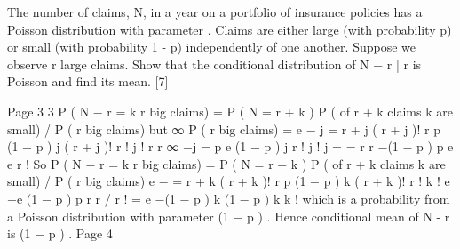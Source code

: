 \documentclass[a4paper,12pt]{article}
\begin{document}
The number of claims, N, in a year on a portfolio of insurance policies has a Poisson
distribution with parameter \lambda. Claims are either large (with probability p) or small
(with probability 1 - p) independently of one another.
Suppose we observe r large claims. Show that the conditional distribution of N − r | r
is Poisson and find its mean.
[7]

Page 3%
3
P ( N − r = k r big claims) = P ( N = r + k ) \times  P ( of r + k claims k are small) / P ( r big claims)
but
∞
P ( r big claims) = \sum  e −\lambda
j = \theta 
\lambda r + j
( r + j )! r
\times 
p (1 − p ) j
( r + j )! r ! j !
\lambda r r ∞ −\lambda \lambda j
=
p \times  \sum  e
(1 − p ) j
r !
j !
j = \theta 
=
\lambda r r −\lambda \lambda (1 − p )
p e e
r !
So
P ( N − r = k r big claims) = P ( N = r + k ) \times  P ( of r + k claims k are small) / P ( r big claims)
e −\lambda
=
\lambda r + k
( r + k )! r
\times 
p (1 − p ) k
( r + k )! r ! k !
e −\lambda e \lambda (1 − p ) p r \lambda r / r !
= e −\lambda (1 − p )
\lambda k (1 − p ) k
k !
which is a probability from a Poisson distribution with parameter \lambda (1 − p ) . Hence
conditional mean of N - r is \lambda (1 − p ) .
Page 4%
\end{document}

